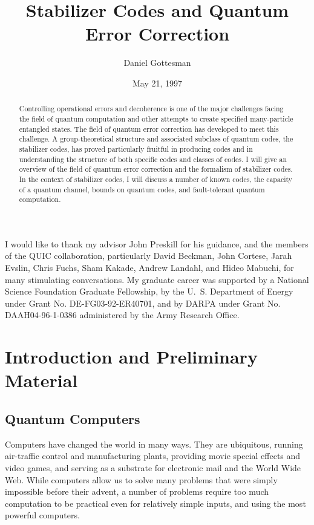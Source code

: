 \documentclass{report}
\title{Stabilizer Codes and Quantum Error Correction}
\author{Daniel Gottesman}
\date{May 21, 1997}
\begin{document}
\maketitle

\makecopyright

\begin{acknowledgements}
I would like to thank my advisor John Preskill for his guidance, and
the members of the QUIC collaboration, particularly David Beckman, John
Cortese, Jarah Evslin, Chris Fuchs, Sham Kakade, Andrew Landahl, and
Hideo Mabuchi, for many stimulating conversations.  My graduate career
was supported by a National Science Foundation Graduate Fellowship, by the 
U.~S. Department of Energy under Grant No. DE-FG03-92-ER40701, and by
DARPA under Grant No. DAAH04-96-1-0386 administered by the Army Research
Office.
\end{acknowledgements}

\begin{abstract}
Controlling operational errors and decoherence is one of the major 
challenges facing the field of quantum computation and other attempts
to create specified many-particle entangled states.  The field of quantum
error correction has developed to meet this challenge.  A group-theoretical 
structure and associated subclass of quantum codes, the stabilizer codes,
has proved particularly fruitful in producing codes and in understanding the 
structure of both specific codes and classes of codes.  I will give an 
overview of the field of quantum error correction and the formalism of 
stabilizer codes.  In the context of stabilizer codes, I will discuss a 
number of known codes, the capacity of a quantum channel, bounds on 
quantum codes, and fault-tolerant quantum computation.
\end{abstract}

\tableofcontents
\listoftables
\listoffigures

\chapter{Introduction and Preliminary Material}
\label{chap-intro}

\section{Quantum Computers}

Computers have changed the world in many ways.  They are ubiquitous, 
running air-traffic control and manufacturing plants, providing movie 
special effects and video games, and serving as a substrate for electronic 
mail and the World Wide Web.  While computers allow us to solve many 
problems that were simply impossible before their advent, a number of 
problems require too much computation to be practical even for relatively 
simple inputs, and using the most powerful computers.
\end{document}
